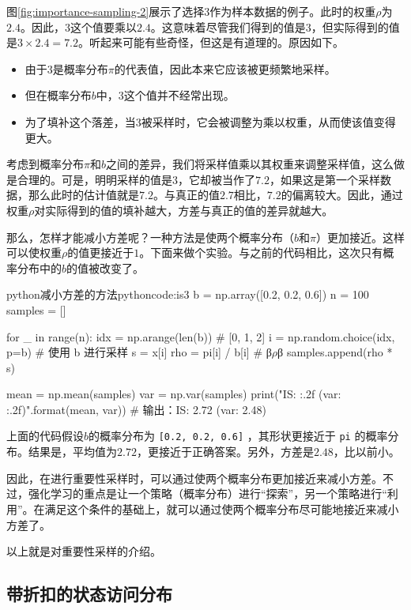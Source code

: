 \documentclass[lang=cn,newtx,10pt,scheme=chinese]{elegantbook}
\newcommand{\py}[1]{%
  \colorbox{gray!10}{\texttt{#1}}%
}
\begin{document}
图\ref{fig:importance-sampling-2}展示了选择$3$作为样本数据的例子。此时的权重$\rho$为$2.4$。因此，$3$这个值要乘以$2.4$。这意味着尽管我们得到的值是$3$，但实际得到的值是$3\times{2.4}=7.2$。听起来可能有些奇怪，但这是有道理的。原因如下。

\begin{itemize}
    \item 由于$3$是概率分布$\pi$的代表值，因此本来它应该被更频繁地采样。
    \item 但在概率分布$b$中，$3$这个值并不经常出现。
    \item 为了填补这个落差，当$3$被采样时，它会被调整为乘以权重，从而使该值变得更大。
\end{itemize}

考虑到概率分布$\pi$和$b$之间的差异，我们将采样值乘以其权重来调整采样值，这么做是合理的。可是，明明采样的值是$3$，它却被当作了$7.2$，如果这是第一个采样数据，那么此时的估计值就是$7.2$。与真正的值$2.7$相比，$7.2$的偏离较大。因此，通过权重$\rho$对实际得到的值的填补越大，方差与真正的值的差异就越大。

那么，怎样才能减小方差呢？一种方法是使两个概率分布（$b$和$\pi$）更加接近。这样可以使权重$\rho$的值更接近于$1$。下面来做个实验。与之前的代码相比，这次只有概率分布中的$b$的值被改变了。

\begin{codebox}{python}{减小方差的方法}{pythoncode:is3}
b = np.array([0.2, 0.2, 0.6])
n = 100
samples = []

for _ in range(n):
    idx = np.arange(len(b)) # [0, 1, 2]
    i = np.random.choice(idx, p=b) # 使用 b 进行采样
    s = x[i]
    rho = pi[i] / b[i] # β$\rho$β
    samples.append(rho * s)

mean = np.mean(samples)
var = np.var(samples)
print("IS: {:.2f} (var: {:.2f})".format(mean, var)) # 输出：IS: 2.72 (var: 2.48)
\end{codebox}

上面的代码假设$b$的概率分布为\py{[0.2, 0.2, 0.6]}，其形状更接近于\py{pi}的概率分布。结果是，平均值为$2.72$，更接近于正确答案。另外，方差是$2.48$，比以前小。

因此，在进行重要性采样时，可以通过使两个概率分布更加接近来减小方差。不过，强化学习的重点是让一个策略（概率分布）进行``探索''，另一个策略进行``利用''。在满足这个条件的基础上，就可以通过使两个概率分布尽可能地接近来减小方差了。

以上就是对重要性采样的介绍。

\subsection{带折扣的状态访问分布}
\end{document}
